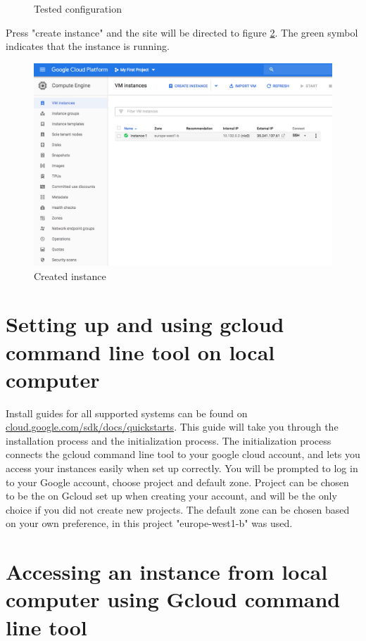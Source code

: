 \begin{figure}
    \caption{Tested configuration}
    \label{fig:gcloud2}
\end{figure}

\vspace{3mm}
\noindent
Press "create instance" and the site will be directed to figure \ref{fig:created_instance}. The green symbol indicates that the instance is running.

\begin{figure}
    \centering
    \includegraphics[scale=0.5]{images/created_instance.png}
    \caption{Created instance}
    \label{fig:created_instance}
\end{figure}
\newpage

\section{Setting up  and using gcloud command line tool on local computer}

Install guides for all supported systems can be found on \url{cloud.google.com/sdk/docs/quickstarts}. This guide will take you through the installation process and the initialization process. The initialization process connects the gcloud command line tool to your google cloud account, and lets you access your instances easily when set up correctly. You will be prompted to log in to your Google account, choose project and default zone. Project can be chosen to be the on Gcloud set up when creating your account, and will be the only choice if you did not create new projects. The default zone can be chosen based on your own preference, in this project "europe-west1-b" was used. 

\section{Accessing an instance from local computer using Gcloud command line tool}


